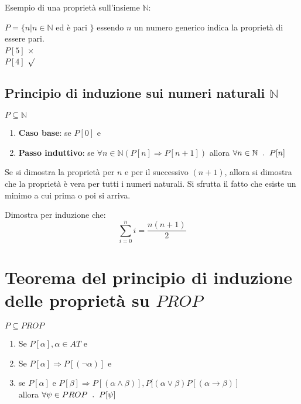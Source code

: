 \documentclass{article}
\theoremstyle{break}
\theoremstyle{break}
\theoremstyle{break}
\theoremstyle{break}
\begin{document}
\begin{example}
  Esempio di una proprietà sull'insieme \( \mathbb{N} \):

  \( P = \{n | n \in \mathbb{N} \) ed è pari \( \} \) essendo \( n \) un numero generico
  indica la proprietà di essere pari.
  \\
  \( P[5] \) \( \times  \)\\
  \( P[4] \) \( \surd \)
\end{example}

\subsection{Principio di induzione sui numeri naturali \texorpdfstring{\( \mathbb{N} \)}{N}}
\( P \subseteq \mathbb{N} \)
\begin{enumerate}
  \item \textbf{Caso base}: se \( P[0] \) e
  \item \textbf{Passo induttivo}: se \( \forall n \in \mathbb{N} (P[n] \Rightarrow P[n+1]) \)
    allora \( \forall n \in \mathbb{N} \hspace{2mm} . \hspace{2mm} P[n] \)
\end{enumerate}

Se si dimostra la proprietà per \( n \) e per il successivo \( (n+1) \), allora
si dimostra che la proprietà è vera per tutti i numeri naturali. Si sfrutta
il fatto che esiste un minimo a cui prima o poi si arriva.
\begin{exercise}
  Dimostra per induzione che:
  \[\sum_{i=0}^{n} i = \frac{n(n+1)}{2}\]

\end{exercise}
\section{Teorema del principio di induzione delle proprietà su \texorpdfstring{\( PROP \)}{PROP}}
\begin{definition}
  \( P \subseteq PROP \)
  \begin{enumerate}
    \item Se \( P[\alpha ], \alpha \in AT \) e
    \item Se \( P[\alpha ] \Rightarrow P[(\neg \alpha )] \) e
    \item se \( P[\alpha ]\) e \(P[\beta ] \Rightarrow P[(\alpha \wedge \beta )],
      P[(\alpha \vee \beta) P[(\alpha \to \beta )]\)\\
      allora \( \forall \psi \in PROP \hspace{2mm} . \hspace{2mm} P[\psi]\)
  \end{enumerate}
\end{definition}
\end{document}
